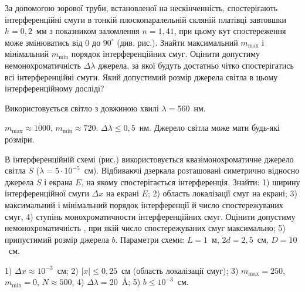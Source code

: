 \begin{problem}%
За допомогою зорової труби, встановленої на нескінченність,
спостерігають інтерференційні смуги в тонкій плоскопаралельній
скляній платівці завтовшки $ h=0,2 $~мм з показником заломлення $ n =
	1,41 $, при цьому кут спостереження  може змінюватись від $ 0 $ до $ 90^\circ $
(див. рис.). Знайти максимальний $ m_{\max} $ і мінімальний $ m_{\min} $ порядок
інтерференційних смуг. Оцінити допустиму немонохроматичність $ \Delta\lambda $
джерела, за якої будуть достатньо чітко спостерігатись всі
інтерференційні смуги. Який допустимий розмір джерела світла в цьому
інтерференційному досліді?

\begin{center}
	
\end{center}

Використовується світло з довжиною хвилі $ \lambda = 560 $~нм.
\begin{solution}
	$ m_{\max} \approx 1000$, $ m_{\min} \approx 720 $. $ \Delta\lambda \le 0,5 $~нм. Джерело світла може мати будь-які розміри.
\end{solution}
\end{problem}


\begin{problem}%
В інтерференційній схемі (рис.) використовується
квазімонохроматичне джерело світла $ S $ ($ \lambda = 5\cdot10^{-5} $~см). Відбиваючі
дзеркала розташовані симетрично відносно джерела $ S $ і екрана $ E $, на
якому спостерігається інтерференція. Знайти: 1) ширину
інтерференційної смуги $ \Delta x $ на екрані $ E $; 2) область локалізації смуг на
екрані; 3) максимальний і мінімальний порядок інтерференції й число
спостережуваних смуг, 4) ступінь монохроматичности
інтерференційних смуг. Оцінити допустиму немонохроматичність , при якій
число спостережуваних смуг максимально; 5) припустимий розмір
джерела $ b $. Параметри схеми: $ L = 1 $~м, $ 2d = 2,5 $~см, $ D = 10 $~см.

\begin{center}
	
\end{center}

\begin{solution}
	1) $\Delta x \approx 10^{-3}$~см; 2) $|x| \le 0,25$~см (область локалізації смуг); 3) $ m_{\max} = 250$, $ m_{\min} = 0$, $N \approx 500$, 4) $\Delta\lambda = 20$~\AA; 5) $ b \le 10^{-3}$~см.
\end{solution}
\end{problem}


